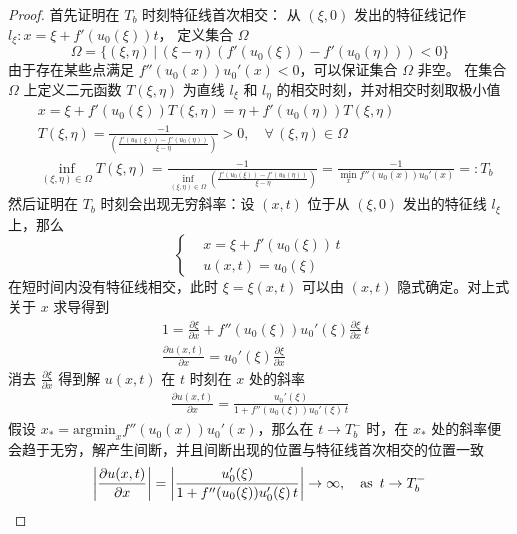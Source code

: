 \begin{proof}
    首先证明在 $T_b$ 时刻特征线首次相交：
    从 $(\xi,0)$ 发出的特征线记作 $l_\xi: x = \xi + f'(u_0(\xi))t$，
    定义集合 $\Omega$
    \[
        \Omega = \{(\xi,\eta) \,|\,  (\xi-\eta)(f'(u_0(\xi)) - f'(u_0(\eta))) < 0\}
    \]
    由于存在某些点满足 $f''(u_0(x)) u_0'(x)<0$，可以保证集合 $\Omega$ 非空。
    在集合 $\Omega$ 上定义二元函数 $T(\xi,\eta)$ 为直线 $l_\xi$ 和 $l_\eta$ 的相交时刻，并对相交时刻取极小值
    \begin{align*}
         & x = \xi + f'(u_0(\xi)) T(\xi,\eta) = \eta + f'(u_0(\eta))T(\xi,\eta)                                                                       \\
         & T(\xi,\eta) = \frac{-1}{\left(\frac{f'(u_0(\xi))-f'(u_0(\eta))}{\xi-\eta}\right)} > 0 ,\quad \forall\, (\xi,\eta) \in \Omega               \\
         & \inf_{(\xi,\eta)\in \Omega} T(\xi,\eta) = \frac{-1}{\inf_{(\xi,\eta)\in \Omega} \left(\frac{f'(u_0(\xi))-f'(u_0(\eta))}{\xi-\eta}\right) }
        = \frac{-1}{\min_x f''(u_0(x)) u_0'(x)} =: T_b
    \end{align*}
    然后证明在 $T_b$ 时刻会出现无穷斜率：设 $(x,t)$ 位于从 $(\xi,0)$ 发出的特征线 $l_\xi$ 上，那么
    \[
        \left\{
        \begin{aligned}
             & x = \xi + f'(u_0(\xi))\, t \\
             & u(x,t) = u_0(\xi)
        \end{aligned}
        \right.
    \]
    在短时间内没有特征线相交，此时 $\xi = \xi(x,t)$ 可以由 $(x,t)$ 隐式确定。对上式关于 $x$ 求导得到
    \begin{align*}
         & 1 = \frac{\partial \xi}{\partial x} + f''(u_0(\xi)) u_0'(\xi) \frac{\partial \xi}{\partial x} \,t \\
         & \frac{\partial u(x,t)}{\partial x} = u_0'(\xi)\frac{\partial \xi}{\partial x}
    \end{align*}
    消去 $\frac{\partial \xi}{\partial x}$ 得到解 $u(x,t)$ 在 $t$ 时刻在 $x$ 处的斜率
    \begin{align*}
        \frac{\partial u(x,t)}{\partial x} =
        \frac{u_0'(\xi)}{1+f''(u_0(\xi)) u_0'(\xi)\,t}
    \end{align*}
    假设 $x_*=\text{argmin}_x f''(u_0(x))u_0'(x)$，那么在 $t \to T_b^-$ 时，在 $x_*$ 处的斜率便会趋于无穷，解产生间断，并且间断出现的位置与特征线首次相交的位置一致
    \[
        \left|\frac{\partial u(x,t)}{\partial x}\right| =  \left|\frac{u_0'(\xi)}{1+f''(u_0(\xi)) u_0'(\xi)\,t}\right| \to \infty,
        \quad \text{as}\,\,\, t \to T_b^-  \qedhere
    \]
\end{proof}

